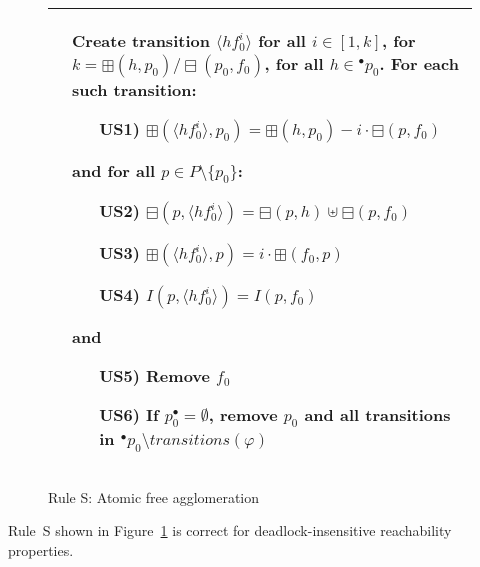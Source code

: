 \begin{figure}[h!]
\begin{adjustbox}{center}
\begin{tabular}{|p{75mm}|p{75mm}|}
        &
        Create transition $\langle hf_0^i\rangle$ for all $i \in [1, k]$, for $k = \boxplus(h,p_0)/\boxminus(p_0,f_0)$, for all $h\in{}^\bullet p_0$.
        For each such transition:
        \begin{itemize}[leftmargin=12mm]
            \item[US1)] $\boxplus(\langle hf_0^i\rangle,p_0)=\boxplus(h,p_0) - i\cdot\boxminus(p,f_0)$
        \end{itemize}
        \hspace{2mm}
        \noindent and for all $p\in P\setminus\{p_0\}$:
        \begin{itemize}[leftmargin=12mm]
            \item[US2)] $\boxminus(p,\langle hf_0^i\rangle)=\boxminus(p,h)\uplus\boxminus(p,f_0)$
            \item[US3)] $\boxplus(\langle hf_0^i\rangle,p)=i\cdot\boxplus(f_0,p)$
            \item[US4)] $I(p,\langle hf_0^i\rangle) = I(p,f_0)$
        \end{itemize}
        \hspace{2mm}
        \noindent and
        \begin{itemize}[leftmargin=12mm]
            \item[US5)] Remove $f_0$
            \item[US6)] If $p_0^\bullet = \emptyset$, remove $p_0$ and all transitions in ${}^\bullet p_0\setminus transitions(\varphi)$
        \end{itemize} \\ \hline
        \end{tabular}
    \end{adjustbox}
    \caption{Rule S: Atomic free agglomeration}
    \label{fig:rule_s}
\end{figure}

\begin{theorem}
    Rule~S shown in Figure~\ref{fig:rule_s} is correct for deadlock-insensitive reachability properties.
\end{theorem}

